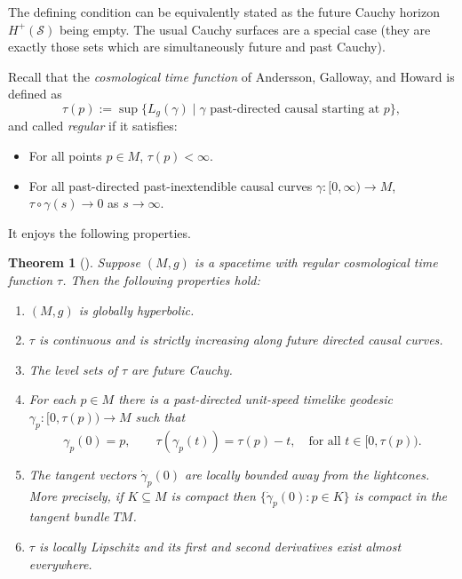 \documentclass[a4paper,11pt]{amsart}
\newtheorem{theorem}{{Theorem}}[section]
\newcommand{\CS}{\mathcal{S}}
\begin{document}
The defining condition can be equivalently stated as the future Cauchy horizon $H^+(\CS)$ being empty. The usual Cauchy surfaces are a special case (they are exactly those sets which are simultaneously future and past Cauchy). 

Recall that the \emph{cosmological time function} of Andersson, Galloway, and Howard is defined as
\begin{equation*}
 \tau(p) := \sup \{ L_g(\gamma) \mid \gamma \text{ past-directed causal starting at } p\},
\end{equation*}
and called \emph{regular} \cite[Def.~1.1]{AGH98} if it satisfies:
\begin{itemize}
    \item For all points $p \in M$, $\tau(p) < \infty$.
    \item For all past-directed past-inextendible causal curves $\gamma \colon [0,\infty) \to M$, $\tau \circ \gamma(s) \to 0$ as $s \to \infty$.
\end{itemize}
It enjoys the following properties.

\begin{theorem}[{\cite[Thm.~1.2 \& Cor.~2.6]{AGH98}}] \label{thm:timereg}
Suppose $(M,g)$ is a spacetime with regular cosmological time function $\tau$. Then the following properties hold:
\begin{enumerate}
 \item $(M,g)$ is globally hyperbolic.
 \item $\tau$ is continuous and is strictly increasing along future directed causal curves.
 \item The level sets of $\tau$ are future Cauchy.
 \item For each $p\in M$ there is a past-directed unit-speed timelike geodesic $\gamma_p:[0,\tau(p)) \to M$ such that
 \begin{equation*}
  \gamma_p(0)=p,\qquad \tau(\gamma_p(t))=\tau(p) - t,\quad \text{for all } t\in [0,\tau(p)).
 \end{equation*}
 \item The tangent vectors  $\dot\gamma_p(0)$ are locally bounded away from the lightcones. More precisely, if $K\subseteq M$ is compact then $\{\dot\gamma_p(0):p\in K\}$ is compact in the tangent bundle $TM$.
 \item $\tau$ is locally Lipschitz and its first and second derivatives exist almost everywhere.
\end{enumerate}
\end{theorem}
\end{document}
